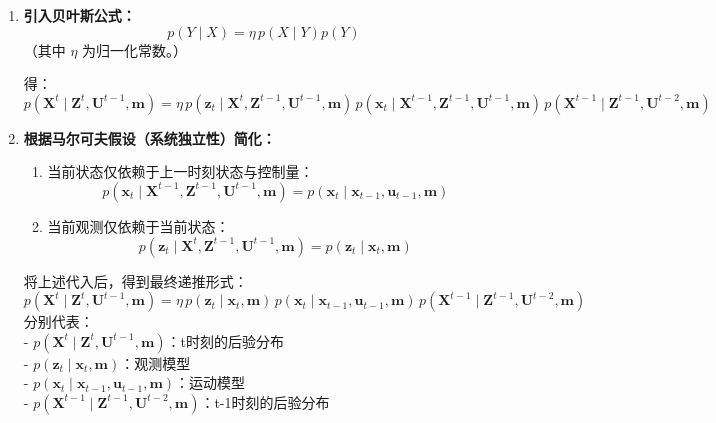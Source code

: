 \documentclass[../main.tex]{subfiles}
\begin{document}
\begin{enumerate}
\begin{enumerate}
{\begin{enumerate}
        \item \textbf{引入贝叶斯公式：}
        \[
        p(Y \mid X) = \eta \, p(X \mid Y)p(Y)
        \]
        （其中 \(\eta\) 为归一化常数。）
        
        得：
        \[
        p(\mathbf{X}^{t} \mid \mathbf{Z}^{t}, \mathbf{U}^{t-1}, \mathbf{m})
        = \eta \, p(\mathbf{z}_t \mid \mathbf{X}^{t}, \mathbf{Z}^{t-1}, \mathbf{U}^{t-1}, \mathbf{m})
        \, p(\mathbf{x}_t \mid \mathbf{X}^{t-1}, \mathbf{Z}^{t-1}, \mathbf{U}^{t-1}, \mathbf{m})
        \, p(\mathbf{X}^{t-1} \mid \mathbf{Z}^{t-1}, \mathbf{U}^{t-2}, \mathbf{m})
        \]
        
        \item \textbf{根据马尔可夫假设（系统独立性）简化：}
        \begin{enumerate}
            \item 当前状态仅依赖于上一时刻状态与控制量：
            \[
            p(\mathbf{x}_t \mid \mathbf{X}^{t-1}, \mathbf{Z}^{t-1}, \mathbf{U}^{t-1}, \mathbf{m})
            = p(\mathbf{x}_t \mid \mathbf{x}_{t-1}, \mathbf{u}_{t-1}, \mathbf{m})
            \]
            \item 当前观测仅依赖于当前状态：
            \[
            p(\mathbf{z}_t \mid \mathbf{X}^{t}, \mathbf{Z}^{t-1}, \mathbf{U}^{t-1}, \mathbf{m})
            = p(\mathbf{z}_t \mid \mathbf{x}_t, \mathbf{m})
            \]
        \end{enumerate}
        
        将上述代入后，得到最终递推形式：
        \[
        \boxed{
        p(\mathbf{X}^{t} \mid \mathbf{Z}^{t}, \mathbf{U}^{t-1}, \mathbf{m})
        = \eta \, p(\mathbf{z}_t \mid \mathbf{x}_t, \mathbf{m})
        \, p(\mathbf{x}_t \mid \mathbf{x}_{t-1}, \mathbf{u}_{t-1}, \mathbf{m})
        \, p(\mathbf{X}^{t-1} \mid \mathbf{Z}^{t-1}, \mathbf{U}^{t-2}, \mathbf{m})
        }
        \]
        分别代表：\\
        - \( p(\mathbf{X}^{t} \mid \mathbf{Z}^{t}, \mathbf{U}^{t-1}, \mathbf{m}) \)：t时刻的后验分布\\
        - \( p(\mathbf{z}_t \mid \mathbf{x}_t, \mathbf{m}) \)：观测模型\\
        - \( p(\mathbf{x}_t \mid \mathbf{x}_{t-1}, \mathbf{u}_{t-1}, \mathbf{m}) \)：运动模型  \\
        - \( p(\mathbf{X}^{t-1} \mid \mathbf{Z}^{t-1}, \mathbf{U}^{t-2}, \mathbf{m}) \)：t-1时刻的后验分布
        

\end{enumerate}}
\end{enumerate}
\end{enumerate}
\end{document}
